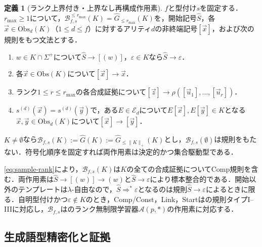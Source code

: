 \documentclass[11pt,a4paper]{ltjsarticle}
\numberwithin{equation}{section}
\theoremstyle{plain}
\theoremstyle{definition}
\newtheorem{definition}[theorem]{定義}
\theoremstyle{remark}
\newcommand{\tuple}[1]{\vec{#1}}
\newcommand{\eps}{\varepsilon}
\begin{document}
\begin{definition}[ランク上界付き・上界なし再構成作用素]
\label{def:reconstruction}
$f$と型付け$s$を固定する．$r_{\max}\ge1$について，$\mathcal B_{f,s}^{\le r_{\max}}(K)=\widehat G_{\le r_{\max}}(K)$を，開始記号$\widehat S$，各$\tuple x\in\mathrm{Obs}_d(K)$（$1\le d\le f$）に対するアリティ$d$の非終端記号$[\tuple x]$，および次の規則をもつ文法とする．
\begin{enumerate}[leftmargin=*]
\item[\textnormal{(Start)}] $w\in K\cap\Sigma^+$について$\widehat S\to[(w)]$，$\eps\in K$なら$\widehat S\to\eps$．
\item[\textnormal{(Const)}] 各$\tuple x\in\mathrm{Obs}(K)$について$[\tuple x]\to\tuple x$．
\item[\textnormal{(Comp)}] ランク$1\le r\le r_{\max}$の各合成証拠について$[\tuple z]\to\rho([\tuple u_1],\ldots,[\tuple u_r])$．
\item[\textnormal{(Link)}] $s^{(d)}(\tuple x)=s^{(d)}(\tuple y)$で，ある$E\in\mathcal E_d$について$E[\tuple x],E[\tuple y]\in K$となる$\tuple x,\tuple y\in\mathrm{Obs}_d(K)$について$[\tuple x]\to[\tuple y]$．
\end{enumerate}
$K\ne\emptyset$なら$\mathcal B_{f,s}(K):=\widehat G(K):=\widehat G_{\le\|K\|_+}(K)$とし，$\mathcal B_{f,s}(\emptyset)$は規則をもたない．符号化順序を固定すれば両作用素は決定的かつ集合駆動型である．
\end{definition}

\eqref{eq:sample-rank}により，$\mathcal B_{f,s}(K)$は$K$の全ての合成証拠についてComp規則を含む．両作用素は$\widehat S\to[(w)]\to(w)$と$\widehat S\to\eps$により標本整合的である．開始以外のテンプレートは$\lambda$-自由なので，$\widehat S\Rightarrow^*\eps$となるのは規則$\widehat S\to\eps$によるときに限る．自明型付けかつ$\eps\notin K$のとき，Comp/Const，Link，Startは\cite[Section~4.1]{Yoshinaka2011}の規則タイプI--IIIに対応し，$\mathcal B_{f,s}$は\cite[Corollary~2]{Yoshinaka2011}のランク無制限学習器$\mathcal A(p,*)$の作用素に対応する．

\subsection{生成語型精密化と証拠}
\label{sec:refinement}
\end{document}
